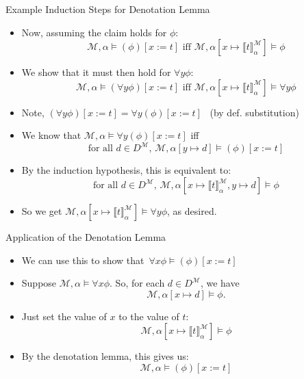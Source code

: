 \begin{frame}{Example Induction Steps for Denotation Lemma}

  \begin{itemize}
  \itemsep=12pt

  \item Now, assuming the claim holds for $\phi$:
    \[\mathcal{M},\alpha\vDash (\phi)[x:=t]\text{ iff
              }\mathcal{M},\alpha[x\mapsto \llbracket
              t\rrbracket^\mathcal{M}_\alpha]\vDash \phi\]

   \item We show that it must then hold for $\forall y\phi$:
            \[\mathcal{M},\alpha\vDash (\forall
              y\phi)[x:=t]\text{ iff }
              \mathcal{M},\alpha[x\mapsto \llbracket
              t\rrbracket^\mathcal{M}_\alpha]\vDash \forall
              y\phi\]

    \item Note, $(\forall y\phi)[x:=t] =\forall y(\phi)[x:=t]$ \, (by def. substitution)

    \item We know that $\mathcal{M},\alpha\vDash \forall y(\phi)[x:=t]$ iff 
      \[\text{for all } d\in D^\mathcal{M},\, \mathcal{M},\alpha[y\mapsto d]\vDash (\phi)[x:=t]\]

    \item By the induction hypothesis, this is equivalent to:
      \[\text{for all } d\in D^\mathcal{M},\, \mathcal{M},\alpha[x\mapsto \llbracket t\rrbracket^\mathcal{M}_\alpha,y\mapsto d]\vDash \phi\]

      \item So we get $\mathcal{M},\alpha[x\mapsto \llbracket
              t\rrbracket^\mathcal{M}_\alpha]\vDash \forall
              y\phi$, as desired.
    
  \end{itemize}
  
\end{frame}

\begin{frame}{Application of the Denotation Lemma}

  \begin{itemize}
  \itemsep=16pt
  
  \item We can use this to show that\, $\forall x\phi\vDash(\phi)[x:=t]$

  \item Suppose $\mathcal{M},\alpha\vDash\forall x\phi$. So, for each $d\in D^\mathcal{M}$, we have
      \[\mathcal{M},\alpha[x\mapsto d]\vDash \phi.\]

    \item Just set the value of $x$ to the value of $t$:
      \[\mathcal{M},\alpha[x\mapsto \llbracket
        t\rrbracket^\mathcal{M}_\alpha]\vDash \phi\]

      \item By the denotation lemma, this gives
        us: \[\mathcal{M},\alpha\vDash(\phi)[x:=t]\]
        
    \end{itemize}

\end{frame}

